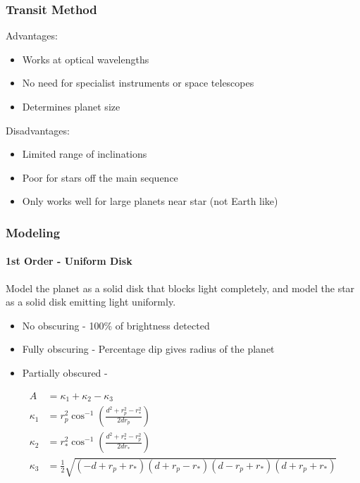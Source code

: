 \documentclass{beamer}
\begin{document}
  \begin{frame}
    \frametitle{Transit Method}
    Advantages:
    \begin{itemize}
        \item Works at optical wavelengths
        \item No need for specialist instruments or space telescopes
        \item Determines planet size
    \end{itemize}
    Disadvantages:
    \begin{itemize}
        \item Limited range of inclinations
        \item Poor for stars off the main sequence
        \item Only works well for large planets near star (not Earth like)
    \end{itemize}
  \end{frame}
  \begin{frame}
    \frametitle{Modeling}
    \framesubtitle{1st Order - Uniform Disk}
    Model the planet as a solid disk that blocks light completely, and model the star as a solid disk emitting light uniformly.
    \begin{itemize}
        \item No obscuring - 100\% of brightness detected
        \item Fully obscuring - Percentage dip gives radius of the planet
        \item Partially obscured -
    \end{itemize}
    \small
    \begin{align*}
    A &= \kappa_1 + \kappa_2 - \kappa_3 \\
    \kappa_1 &= r_p^2\cos^{-1}\left(\frac{d^2 + r_p^2 - r_*^2}{2dr_p}\right)\\
    \kappa_2 &= r_*^2\cos^{-1}\left(\frac{d^2 + r_*^2 - r_p^2}{2dr_*}\right)\\
        \kappa_3 &= \frac{1}{2}\sqrt{(-d + r_p + r_*)(d + r_p - r_*)(d - r_p + r_*)(d + r_p + r_*)}
    \end{align*}
  \end{frame}
\end{document}
